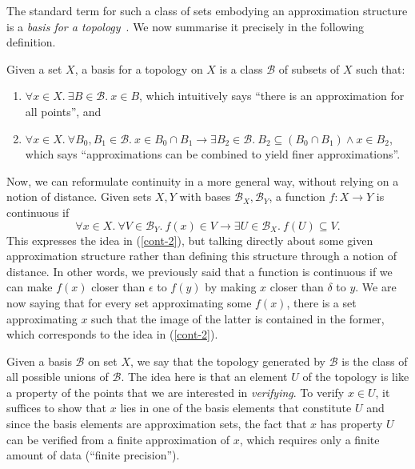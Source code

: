 The standard term for such a class of sets embodying an approximation structure is a
\emph{basis for a topology}~\cite{munkres}. We now summarise it precisely in the following
definition.
\begin{defn}
  Given a set $X$, a basis for a topology on $X$ is a class $\mathcal{B}$ of subsets of
  $X$ such that:
  \begin{enumerate}
  \item $\forall x \in X.~\exists B \in \mathcal{B}.~x \in B$, which intuitively says ``there is an
    approximation for all points'', and
  \item $\forall x \in X.~\forall B_0, B_1 \in \mathcal{B}.~x \in B_0 \cap B_1 \rightarrow
    \exists B_2 \in \mathcal{B}.~ B_2 \subseteq (B_0 \cap B_1) \wedge x \in B_2$, which says
    ``approximations can be combined to yield finer approximations''.
  \end{enumerate}
\end{defn}

Now, we can reformulate continuity in a more general way, without relying on a notion of
distance. Given sets $X, Y$ with bases $\mathcal{B}_X, \mathcal{B}_Y$, a function $f : X \rightarrow
Y$ is continuous if
\begin{equation}\label{cont-basis}
  \forall x \in X.~ \forall V \in \mathcal{B}_Y.~ f(x) \in V \rightarrow \exists U \in \mathcal{B}_X.~
    f(U) \subseteq V.
\end{equation}
This expresses the idea in (\ref{cont-2}), but talking directly about some given
approximation structure rather than defining this structure through a notion of distance.
In other words, we previously said that a function is continuous if we can make $f(x)$
closer than $\epsilon$ to $f(y)$ by making $x$ closer than $\delta$ to $y$. We are now saying that for
every set approximating some $f(x)$, there is a set approximating $x$ such that the image
of the latter is contained in the former, which corresponds to the idea in (\ref{cont-2}).

Given a basis $\mathcal{B}$ on set $X$, we say that the topology generated by
$\mathcal{B}$ is the class of all possible unions of $\mathcal{B}$. The idea here is that
an element $U$ of the topology is like a property of the points that we are interested in
\emph{verifying}. To verify $x \in U$, it suffices to show that $x$ lies in one of the basis
elements that constitute $U$ and since the basis elements are approximation sets, the fact
that $x$ has property $U$ can be verified from a finite approximation of $x$, which
requires only a finite amount of data (``finite precision'').

